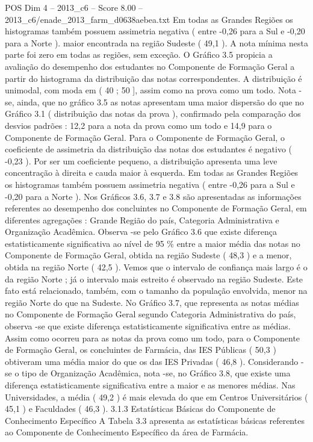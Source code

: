 \begin{textsample}{POS Dim 4 – 2013\_c6 – Score 8.00 – 2013\_c6/enade\_2013\_farm\_d0638aebea.txt}
Em todas as Grandes Regiões os histogramas também possuem assimetria negativa ( entre -0,26 para a Sul e -0,20 para a Norte ). maior encontrada na região Sudeste ( 49,1 ).
A nota mínima nesta parte foi zero em todas as regiões, sem exceção.
O Gráfico 3.5 propicia a avaliação do desempenho dos estudantes no Componente de Formação Geral a partir do histograma da distribuição das notas correspondentes.
A distribuição é unimodal, com moda em ( 40 ; 50 ], assim como na prova como um todo.
Nota -se, ainda, que no gráfico 3.5 as notas apresentam uma maior dispersão do que no Gráfico 3.1 ( distribuição das notas da prova ), confirmado pela comparação dos desvios padrões : 12,2 para a nota da prova como um todo e 14,9 para o Componente de Formação Geral.
Para o Componente de Formação Geral, o coeficiente de assimetria da distribuição das notas dos estudantes é negativo ( -0,23 ).
Por ser um coeficiente pequeno, a distribuição apresenta uma leve concentração à direita e cauda maior à esquerda.
Em todas as Grandes Regiões os histogramas também possuem assimetria negativa ( entre -0,26 para a Sul e -0,20 para a Norte ).
Nos Gráficos 3.6, 3.7 e 3.8 são apresentadas as informações referentes ao desempenho dos concluintes no Componente de Formação Geral, em diferentes agregações : Grande Região do país, Categoria Administrativa e Organização Acadêmica.
Observa -se pelo Gráfico 3.6 que existe diferença estatisticamente significativa ao nível de 95 \% entre a maior média das notas no Componente de Formação Geral, obtida na região Sudeste ( 48,3 ) e a menor, obtida na região Norte ( 42,5 ).
Vemos que o intervalo de confiança mais largo é o da região Norte ; já o intervalo mais estreito é observado na região Sudeste.
Este fato está relacionado, também, com o tamanho da população envolvida, menor na região Norte do que na Sudeste.
No Gráfico 3.7, que representa as notas médias no Componente de Formação Geral segundo Categoria Administrativa do país, observa -se que existe diferença estatisticamente significativa entre as médias.
Assim como ocorreu para as notas da prova como um todo, para o Componente de Formação Geral, os concluintes de Farmácia, das IES Públicas ( 50,3 ) obtiveram uma média maior do que os das IES Privadas ( 46,8 ).
Considerando -se o tipo de Organização Acadêmica, nota -se, no Gráfico 3.8, que existe uma diferença estatisticamente significativa entre a maior e as menores médias.
Nas Universidades, a média ( 49,2 ) é mais elevada do que em Centros Universitários ( 45,1 ) e Faculdades ( 46,3 ). 3.1.3 Estatísticas Básicas do Componente de Conhecimento Específico A Tabela 3.3 apresenta as estatísticas básicas referentes ao Componente de Conhecimento Específico da área de Farmácia.

\end{textsample}
